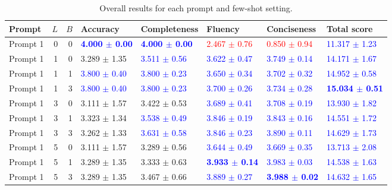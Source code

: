 \begin{table}
\caption{Overall results for each prompt and few-shot setting.}
\begin{tabular}{lrrlllll}
\toprule
Prompt & $L$ & $B$ & Accuracy & Completeness & Fluency & Conciseness & Total score \\
\midrule
Prompt 1 & 0 & 0 & \textbf{\textcolor{blue}{4.000 $\pm$ 0.00}} & \textbf{\textcolor{blue}{4.000 $\pm$ 0.00}} & \textcolor{red}{2.467 $\pm$ 0.76} & \textcolor{red}{0.850 $\pm$ 0.94} & \textcolor{blue}{11.317 $\pm$ 1.23} \\
Prompt 1 & 1 & 0 & 3.289 $\pm$ 1.35 & \textcolor{blue}{3.511 $\pm$ 0.56} & \textcolor{blue}{3.622 $\pm$ 0.47} & \textcolor{blue}{3.749 $\pm$ 0.14} & \textcolor{blue}{14.171 $\pm$ 1.67} \\
Prompt 1 & 1 & 1 & \textcolor{blue}{3.800 $\pm$ 0.40} & \textcolor{blue}{3.800 $\pm$ 0.23} & \textcolor{blue}{3.650 $\pm$ 0.34} & \textcolor{blue}{3.702 $\pm$ 0.32} & \textcolor{blue}{14.952 $\pm$ 0.58} \\
Prompt 1 & 1 & 3 & \textcolor{blue}{3.800 $\pm$ 0.40} & \textcolor{blue}{3.800 $\pm$ 0.23} & \textcolor{blue}{3.700 $\pm$ 0.26} & \textcolor{blue}{3.734 $\pm$ 0.28} & \textbf{\textcolor{blue}{15.034 $\pm$ 0.51}} \\
Prompt 1 & 3 & 0 & 3.111 $\pm$ 1.57 & 3.422 $\pm$ 0.53 & \textcolor{blue}{3.689 $\pm$ 0.41} & \textcolor{blue}{3.708 $\pm$ 0.19} & \textcolor{blue}{13.930 $\pm$ 1.82} \\
Prompt 1 & 3 & 1 & 3.323 $\pm$ 1.34 & \textcolor{blue}{3.538 $\pm$ 0.49} & \textcolor{blue}{3.846 $\pm$ 0.19} & \textcolor{blue}{3.843 $\pm$ 0.16} & \textcolor{blue}{14.551 $\pm$ 1.72} \\
Prompt 1 & 3 & 3 & 3.262 $\pm$ 1.33 & \textcolor{blue}{3.631 $\pm$ 0.58} & \textcolor{blue}{3.846 $\pm$ 0.23} & \textcolor{blue}{3.890 $\pm$ 0.11} & \textcolor{blue}{14.629 $\pm$ 1.73} \\
Prompt 1 & 5 & 0 & 3.111 $\pm$ 1.57 & 3.289 $\pm$ 0.56 & \textcolor{blue}{3.644 $\pm$ 0.49} & \textcolor{blue}{3.669 $\pm$ 0.35} & \textcolor{blue}{13.713 $\pm$ 2.08} \\
Prompt 1 & 5 & 1 & 3.289 $\pm$ 1.35 & 3.333 $\pm$ 0.63 & \textbf{\textcolor{blue}{3.933 $\pm$ 0.14}} & \textcolor{blue}{3.983 $\pm$ 0.03} & \textcolor{blue}{14.538 $\pm$ 1.63} \\
Prompt 1 & 5 & 3 & 3.289 $\pm$ 1.35 & 3.467 $\pm$ 0.66 & \textcolor{blue}{3.889 $\pm$ 0.27} & \textbf{\textcolor{blue}{3.988 $\pm$ 0.02}} & \textcolor{blue}{14.632 $\pm$ 1.65} \\

\end{tabular}
\end{table}
